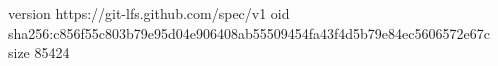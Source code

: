 version https://git-lfs.github.com/spec/v1
oid sha256:c856f55c803b79e95d04e906408ab55509454fa43f4d5b79e84ec5606572e67c
size 85424
